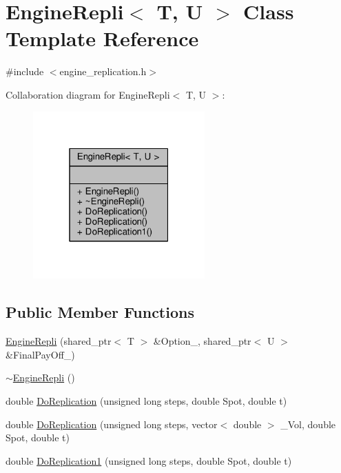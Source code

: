 \hypertarget{classEngineRepli}{}\section{Engine\+Repli$<$ T, U $>$ Class Template Reference}
\label{classEngineRepli}


{\ttfamily \#include $<$engine\+\_\+replication.\+h$>$}



Collaboration diagram for Engine\+Repli$<$ T, U $>$\+:
\nopagebreak
\begin{figure}[H]
\begin{center}
\leavevmode
\includegraphics[width=187pt]{classEngineRepli__coll__graph}
\end{center}
\end{figure}
\subsection*{Public Member Functions}
\begin{DoxyCompactItemize}
\item 
\hyperlink{classEngineRepli_a77ada5e83eb12eaf6b19b0826847cb7d}{Engine\+Repli} (shared\+\_\+ptr$<$ T $>$ \&Option\+\_\+, shared\+\_\+ptr$<$ U $>$ \&Final\+Pay\+Off\+\_\+)
\item 
\hyperlink{classEngineRepli_a328a6ae729326cced7a986a94c8fc45e}{$\sim$\+Engine\+Repli} ()
\item 
double \hyperlink{classEngineRepli_a3dcaf8e4c17db01c3293aafd0f38c670}{Do\+Replication} (unsigned long steps, double Spot, double t)
\item 
double \hyperlink{classEngineRepli_ad247f9177127cffcf82bc6603d7ad1db}{Do\+Replication} (unsigned long steps, vector$<$ double $>$ \+\_\+\+Vol, double Spot, double t)
\item 
double \hyperlink{classEngineRepli_a3eac0deeeb53bf5e034b0d643a8191c6}{Do\+Replication1} (unsigned long steps, double Spot, double t)
\end{DoxyCompactItemize}


